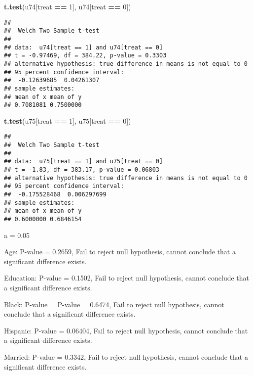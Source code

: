 \documentclass[
]{article}
\newenvironment{Shaded}{\begin{snugshade}}{\end{snugshade}}
\newcommand{\DecValTok}[1]{\textcolor[rgb]{0.00,0.00,0.81}{#1}}
\newcommand{\KeywordTok}[1]{\textcolor[rgb]{0.13,0.29,0.53}{\textbf{#1}}}
\newcommand{\NormalTok}[1]{#1}
\newcommand{\OperatorTok}[1]{\textcolor[rgb]{0.81,0.36,0.00}{\textbf{#1}}}
\newcommand{\StringTok}[1]{\textcolor[rgb]{0.31,0.60,0.02}{#1}}
\begin{document}
\begin{Shaded}
\begin{Highlighting}[]
\KeywordTok{t.test}\NormalTok{(u74[treat }\OperatorTok{==}\StringTok{ }\DecValTok{1}\NormalTok{], u74[treat }\OperatorTok{==}\StringTok{ }\DecValTok{0}\NormalTok{])}
\end{Highlighting}
\end{Shaded}

\begin{verbatim}
## 
##  Welch Two Sample t-test
## 
## data:  u74[treat == 1] and u74[treat == 0]
## t = -0.97469, df = 384.22, p-value = 0.3303
## alternative hypothesis: true difference in means is not equal to 0
## 95 percent confidence interval:
##  -0.12639685  0.04261307
## sample estimates:
## mean of x mean of y 
## 0.7081081 0.7500000
\end{verbatim}

\begin{Shaded}
\begin{Highlighting}[]
\KeywordTok{t.test}\NormalTok{(u75[treat }\OperatorTok{==}\StringTok{ }\DecValTok{1}\NormalTok{], u75[treat }\OperatorTok{==}\StringTok{ }\DecValTok{0}\NormalTok{])}
\end{Highlighting}
\end{Shaded}

\begin{verbatim}
## 
##  Welch Two Sample t-test
## 
## data:  u75[treat == 1] and u75[treat == 0]
## t = -1.83, df = 383.17, p-value = 0.06803
## alternative hypothesis: true difference in means is not equal to 0
## 95 percent confidence interval:
##  -0.175528468  0.006297699
## sample estimates:
## mean of x mean of y 
## 0.6000000 0.6846154
\end{verbatim}

a = 0.05

Age: P-value = 0.2659, Fail to reject null hypothesis, cannot conclude
that a significant difference exists.

Education: P-value = 0.1502, Fail to reject null hypothesis, cannot
conclude that a significant difference exists.

Black: P-value = P-value = 0.6474, Fail to reject null hypothesis,
cannot conclude that a significant difference exists.

Hispanic: P-value = 0.06404, Fail to reject null hypothesis, cannot
conclude that a significant difference exists.

Married: P-value = 0.3342, Fail to reject null hypothesis, cannot
conclude that a significant difference exists.
\end{document}
